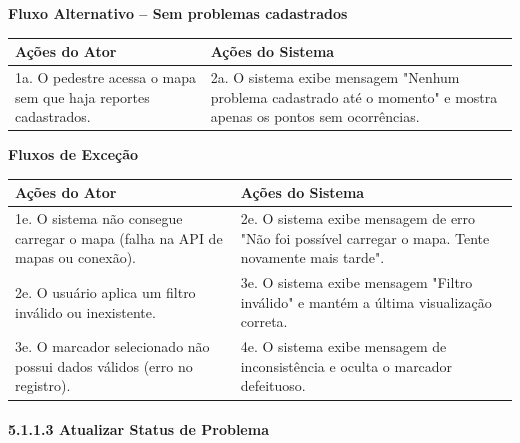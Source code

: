 \documentclass[12pt,a4paper]{article}
\begin{document}
\textbf{Fluxo Alternativo – Sem problemas cadastrados}

\begin{longtable}{|>{\raggedright\arraybackslash}p{7cm}|>{\raggedright\arraybackslash}p{7cm}|}
\hline
\textbf{Ações do Ator} & \textbf{Ações do Sistema} \\
\hline
1a. O pedestre acessa o mapa sem que haja reportes cadastrados. & 2a. O sistema exibe mensagem "Nenhum problema cadastrado até o momento" e mostra apenas os pontos sem ocorrências. \\
\hline
\end{longtable}

\textbf{Fluxos de Exceção}

\begin{longtable}{|>{\raggedright\arraybackslash}p{7cm}|>{\raggedright\arraybackslash}p{7cm}|}
\hline
\textbf{Ações do Ator} & \textbf{Ações do Sistema} \\
\hline
1e. O sistema não consegue carregar o mapa (falha na API de mapas ou conexão). & 2e. O sistema exibe mensagem de erro "Não foi possível carregar o mapa. Tente novamente mais tarde". \\
\hline
2e. O usuário aplica um filtro inválido ou inexistente. & 3e. O sistema exibe mensagem "Filtro inválido" e mantém a última visualização correta. \\
\hline
3e. O marcador selecionado não possui dados válidos (erro no registro). & 4e. O sistema exibe mensagem de inconsistência e oculta o marcador defeituoso. \\
\hline
\end{longtable}

\paragraph{5.1.1.3 Atualizar Status de Problema}
\end{document}

